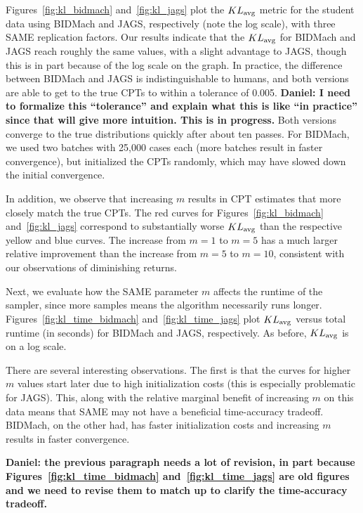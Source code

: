 \documentclass{article} %
\begin{document}
Figures~\ref{fig:kl_bidmach} and~\ref{fig:kl_jags} plot the $KL_{\rm avg}$ metric for the student
data using BIDMach and JAGS, respectively (note the log scale), with three SAME replication factors.
Our results indicate that the $KL_{\rm avg}$ for BIDMach and JAGS reach roughly the same values,
with a slight advantage to JAGS, though this is in part because of the log scale on the graph. In
practice, the difference between BIDMach and JAGS is indistinguishable to humans, and both versions
are able to get to the true CPTs to within a tolerance of 0.005.  \textbf{Daniel: I need to
formalize this ``tolerance'' and explain what this is like ``in practice'' since that will give more
intuition.  This is in progress.} Both versions converge to the true distributions quickly after
about ten passes. For BIDMach, we used two batches with 25,000 cases each (more batches result in
faster convergence), but initialized the CPTs randomly, which may have slowed down the initial
convergence.

In addition, we observe that increasing $m$ results in CPT estimates that more closely match the
true CPTs. The red curves for Figures~\ref{fig:kl_bidmach} and~\ref{fig:kl_jags} correspond to
substantially worse $KL_{\rm avg}$ than the respective yellow and blue curves. The increase from
$m=1$ to $m=5$ has a much larger relative improvement than the increase from $m=5$ to $m=10$,
consistent with our observations of diminishing returns.

Next, we evaluate how the SAME parameter $m$ affects the runtime of the sampler, since more samples
means the algorithm necessarily runs longer. Figures~\ref{fig:kl_time_bidmach}
and~\ref{fig:kl_time_jags} plot $KL_{\rm avg}$ versus total runtime (in seconds) for BIDMach and
JAGS, respectively. As before, $KL_{\rm avg}$ is on a log scale.

There are several interesting observations. The first is that the curves for higher $m$ values start
later due to high initialization costs (this is especially problematic for JAGS). This, along with
the relative marginal benefit of increasing $m$ on this data means that SAME may not have a
beneficial time-accuracy tradeoff. BIDMach, on the other had, has faster initialization costs and
increasing $m$ results in faster convergence.

\textbf{Daniel: the previous paragraph needs a lot of revision, in part because
Figures~\ref{fig:kl_time_bidmach} and~\ref{fig:kl_time_jags} are old figures and we need to revise
them to match up to clarify the time-accuracy tradeoff.}
\end{document}
